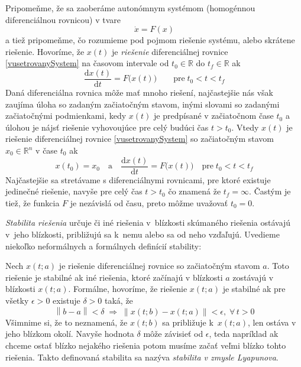 \documentclass[a4paper, 10pt, ]{article}
\begin{document}
Pripomeňme, že sa zaoberáme autonómnym systémom (homogénnou diferenciálnou rovnicou) v tvare
\begin{equation} \label{vusetrovanySystem}
	\dot{x} = F(x)
\end{equation}
a tiež pripomeňme, čo rozumieme pod pojmom riešenie systému, alebo skrátene riešenie. Hovoríme, že $x(t)$ je \emph{riešenie} diferenciálnej rovnice \eqref{vusetrovanySystem} na časovom intervale od $t_0 \in \mathbb{R}$ do $t_f \in \mathbb{R}$ ak
\begin{equation}
	\frac{\text{d}x(t)}{\text{d}t} = F \big( x(t)  \big) \qquad \text{pre} \; t_0 < t < t_f
\end{equation}
Daná diferenciálna rovnica môže mať mnoho riešení, najčastejšie nás však zaujíma úloha so zadaným začiatočným stavom, inými slovami so zadanými začiatočnými podmienkami, kedy $x(t)$ je predpísané v začiatočnom čase $t_0$ a úlohou je nájsť riešenie vyhovoujúce pre celý budúci čas $t>t_0$. Vtedy $x(t)$ je riešenie diferenciálnej rovnice \eqref{vusetrovanySystem} so začiatočným stavom $x_0 \in \mathbb{R}^n$ v čase $t_0$ ak
\begin{equation}
	x(t_0) = x_0 \quad \text{a} \quad \frac{\text{d}x(t)}{\text{d}t} = F \big( x(t)  \big) \quad \text{pre} \; t_0 < t < t_f
\end{equation}
Najčastejšie sa stretávame s diferenciálnymi rovnicami, pre ktoré existuje jedinečné riešenie, navyše pre celý čas $t>t_0$ čo znamená že $t_f = \infty$. Častým je tiež, že funkcia $F$ je nezávislá od času, preto môžme uvažovať $t_0 = 0$.


\emph{Stabilita riešenia} určuje či iné riešenia v~blízkosti skúmaného riešenia ostávajú v~jeho blízkosti, približujú sa k~nemu alebo sa od neho vzďaľujú. Uvedieme niekoľko neformálnych a formálnych definícií stability:

\noindent
Nech $x(t;a)$ je riešenie diferenciálnej rovnice so začiatočným stavom $a$. Toto riešenie je stabilné ak iné riešenia, ktoré začínajú v blízkosti $a$ zostávajú v blízkosti $x(t;a)$. Formálne, hovoríme, že riešenie $x(t;a)$ je stabilné ak pre všetky $\epsilon > 0$ existuje $\delta > 0$ taká, že
\begin{equation} \label{stabilDef}
	\left\| b - a \right\| < \delta \; \Rightarrow \; \left\| x(t;b) - x(t;a) \right\| < \epsilon, \; \forall \, t>0
\end{equation}
Všimnime si, že to neznamená, že $x(t;b)$ sa približuje k~$x(t;a)$, len ostáva v jeho blízkom okolí. Navyše hodnota $\delta$ môže závisieť od $\epsilon$, teda napríklad ak chceme ostať blízko nejakého riešenia potom musíme začať veľmi blízko tohto riešenia. Takto definovaná stabilita sa nazýva \emph{stabilita v zmysle Lyapunova}.
\end{document}
